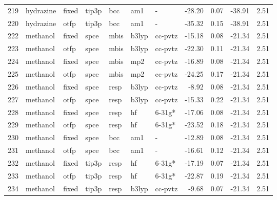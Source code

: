 \begin{tabular}{lllllllrrrr}
219 &                     hydrazine &  fixed &  tip3p &    bcc &     am1 &            - &      -28.20 &     0.07 &      -38.91 &      2.51 \\
220 &                     hydrazine &   otfp &  tip3p &    bcc &     am1 &            - &      -35.32 &     0.15 &      -38.91 &      2.51 \\
222 &                      methanol &  fixed &   spce &   mbis &   b3lyp &      cc-pvtz &      -15.18 &     0.08 &      -21.34 &      2.51 \\
223 &                      methanol &   otfp &   spce &   mbis &   b3lyp &      cc-pvtz &      -22.30 &     0.11 &      -21.34 &      2.51 \\
224 &                      methanol &  fixed &   spce &   mbis &     mp2 &      cc-pvtz &      -16.89 &     0.08 &      -21.34 &      2.51 \\
225 &                      methanol &   otfp &   spce &   mbis &     mp2 &      cc-pvtz &      -24.25 &     0.17 &      -21.34 &      2.51 \\
226 &                      methanol &  fixed &   spce &   resp &   b3lyp &      cc-pvtz &       -8.92 &     0.08 &      -21.34 &      2.51 \\
227 &                      methanol &   otfp &   spce &   resp &   b3lyp &      cc-pvtz &      -15.33 &     0.22 &      -21.34 &      2.51 \\
228 &                      methanol &  fixed &   spce &   resp &      hf &       6-31g* &      -17.06 &     0.08 &      -21.34 &      2.51 \\
229 &                      methanol &   otfp &   spce &   resp &      hf &       6-31g* &      -23.52 &     0.18 &      -21.34 &      2.51 \\
230 &                      methanol &  fixed &   spce &    bcc &     am1 &            - &      -12.89 &     0.08 &      -21.34 &      2.51 \\
231 &                      methanol &   otfp &   spce &    bcc &     am1 &            - &      -16.61 &     0.12 &      -21.34 &      2.51 \\
232 &                      methanol &  fixed &  tip3p &   resp &      hf &       6-31g* &      -17.19 &     0.07 &      -21.34 &      2.51 \\
233 &                      methanol &   otfp &  tip3p &   resp &      hf &       6-31g* &      -22.87 &     0.19 &      -21.34 &      2.51 \\
234 &                      methanol &  fixed &  tip3p &   resp &   b3lyp &      cc-pvtz &       -9.68 &     0.07 &      -21.34 &      2.51 \\

\end{tabular}
